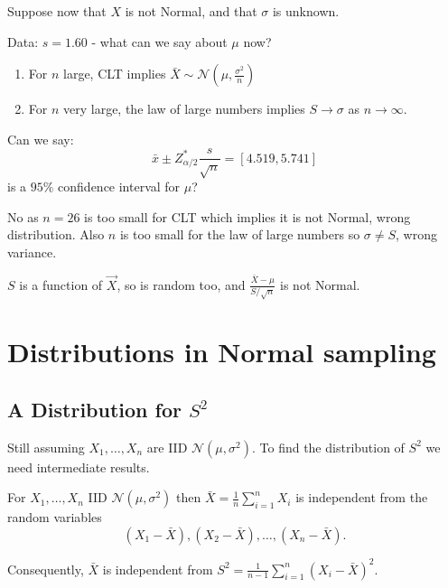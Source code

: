 \documentclass[10pt, a4paper]{article}
\begin{document}
Suppose now that $X$ is not Normal,
and that $\sigma$ is unknown.

Data:
$s = 1.60$ -
what can we say about $\mu$ now?
\begin{enumerate}[label = (\roman*)]
    \item For $n$ large,
    CLT implies $\bar{X} \sim \mathcal{N}\left(\mu, \frac{\sigma ^ 2}{n}\right)$
    
    \item For $n$ very large,
    the law of large numbers implies $S \to \sigma$ as $n \to \infty$.
\end{enumerate}

Can we say:
\[
\bar{x} \pm Z_{\alpha / 2}^{*}\frac{s}{\sqrt{n}} = [4.519, 5.741]
\]
is a $95\%$ confidence interval for $\mu$?

No as $n = 26$ is too small for CLT which implies it is not Normal,
wrong distribution.
Also $n$ is too small for the law of large numbers so $\sigma \neq S$,
wrong variance.

$S$ is a function of $\vec{X}$,
so is random too,
and $\frac{\bar{X} - \mu}{S / \sqrt{n}}$ is not Normal.

\newpage

\section{Distributions in Normal sampling}

\subsection{A Distribution for \texorpdfstring{$S ^ 2$}{}}
Still assuming $X_1, \dotsc, X_n$ are IID $\mathcal{N}(\mu, \sigma ^ 2)$.
To find the distribution of $S ^ 2$ we need intermediate results.

\begin{proposition}
    For $X_1, \dotsc, X_n$ IID $\mathcal{N}(\mu, \sigma ^ 2)$ then $\bar{X} = \frac{1}{n}\sum_{i = 1}^{n}X_i$ is independent from the random variables
    \[
    (X_1 - \bar{X}), (X_2 - \bar{X}), \dotsc, (X_n - \bar{X}).
    \]
\end{proposition}

Consequently,
$\bar{X}$ is independent from $S ^ 2 = \frac{1}{n - 1}\sum_{i = 1}^{n}(X_i - \bar{X}) ^ 2$.
\end{document}
